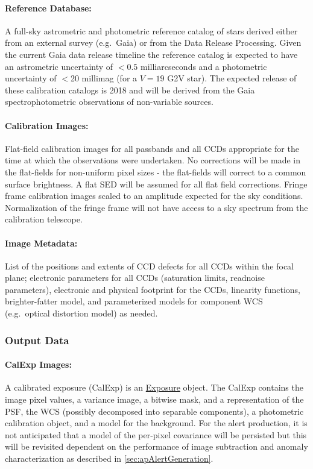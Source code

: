 \paragraph*{Reference Database:} A full-sky astrometric and photometric reference catalog of stars derived either from an external survey (e.g.\ Gaia) or from the Data Release Processing. Given the current Gaia data release timeline the reference catalog is expected to have an astrometric uncertainty of $<0.5$ milliarcseconds and a photometric uncertainty of $<$20 millimag (for a $V=19$ G2V star). The expected release of these calibration catalogs is 2018 and will be derived from the Gaia spectrophotometric observations of non-variable sources.

\paragraph*{Calibration Images:} Flat-field calibration images for all passbands and all CCDs appropriate for the time at which the observations were undertaken. No corrections will be made in the flat-fields for non-uniform pixel sizes - the flat-fields will correct to a common  surface brightness. A flat SED will be assumed for all flat field corrections. Fringe frame calibration images scaled to an amplitude expected for the sky conditions. Normalization of the fringe frame will not have access to a sky spectrum from the calibration telescope.

\paragraph*{Image Metadata:} List of the positions and extents of CCD defects for all CCDs within the focal plane; electronic parameters for all CCDs (saturation limits, readnoise parameters), electronic and physical footprint for the CCDs, linearity functions, brighter-fatter model, and parameterized models for component WCS (e.g.\ optical distortion model) as needed.

\subsubsection{Output Data}
\label{sec:apSFMoutput}

\paragraph*{CalExp Images:} A calibrated exposure (CalExp) is an \hyperref[sec:spImagesExposure]{Exposure} object. The CalExp contains the image pixel values, a variance image, a bitwise mask, and a representation of the PSF, the WCS (possibly decomposed into separable components), a photometric calibration object, and a model for the  background. For the alert production, it is not anticipated that a model of the per-pixel covariance will be persisted but this will be revisited dependent on the performance of image subtraction and anomaly characterization as described in \ref{sec:apAlertGeneration}.

